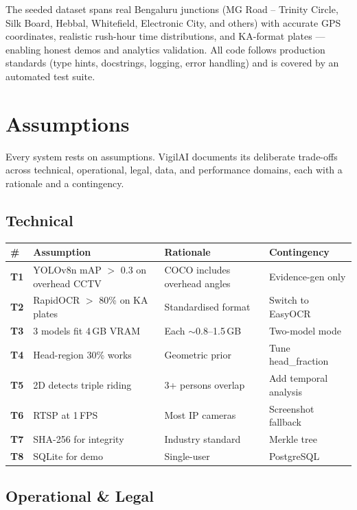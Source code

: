 \documentclass[11pt,a4paper]{article}
\newcommand{\sectionrule}{\noindent{\color{vigilaccent}\rule{0.22\linewidth}{2.2pt}}{\color{vigilaccent!30}\rule{0.78\linewidth}{0.6pt}}\par\vspace{4pt}}
\begin{document}
The seeded dataset spans real Bengaluru junctions (MG Road – Trinity Circle, Silk Board, Hebbal, Whitefield, Electronic City, and others) with accurate GPS coordinates, realistic rush-hour time distributions, and KA-format plates — enabling honest demos and analytics validation. All code follows production standards (type hints, docstrings, logging, error handling) and is covered by an automated test suite.

\section{Assumptions}
\sectionrule

Every system rests on assumptions. VigilAI documents its deliberate trade-offs across technical, operational, legal, data, and performance domains, each with a rationale and a contingency.

\subsection{Technical}

\begin{longtable}{@{}>{\bfseries}p{0.7cm}p{4.5cm}p{4cm}p{3cm}@{}}
\hline
\textbf{\#} & \textbf{Assumption} & \textbf{Rationale} & \textbf{Contingency} \\
\hline
T1 & YOLOv8n mAP $>$ 0.3 on overhead CCTV & COCO includes overhead angles & Evidence-gen only \\
T2 & RapidOCR $>$ 80\% on KA plates & Standardised format & Switch to EasyOCR \\
T3 & 3 models fit 4\,GB VRAM & Each $\sim$0.8--1.5\,GB & Two-model mode \\
T4 & Head-region 30\% works & Geometric prior & Tune head\_fraction \\
T5 & 2D detects triple riding & 3+ persons overlap & Add temporal analysis \\
T6 & RTSP at 1\,FPS & Most IP cameras & Screenshot fallback \\
T7 & SHA-256 for integrity & Industry standard & Merkle tree \\
T8 & SQLite for demo & Single-user & PostgreSQL \\
\hline
\end{longtable}

\subsection{Operational \& Legal}
\end{document}
